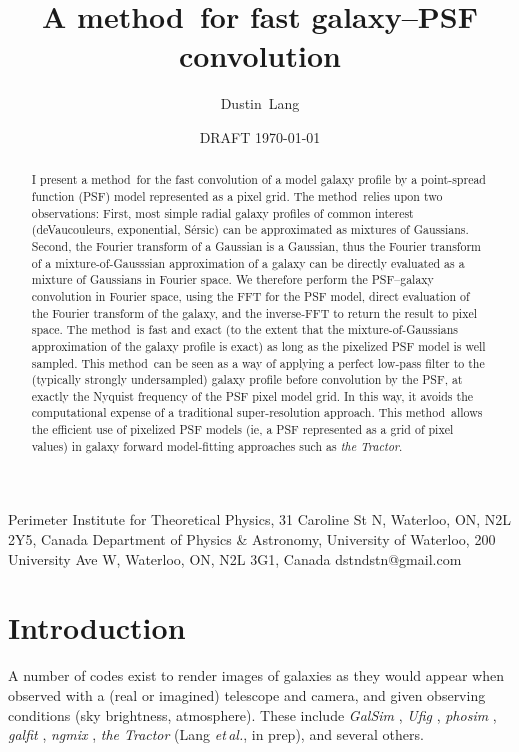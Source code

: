 \documentclass[11pt,preprint]{aastex}
\newcommand{\foreign}[1]{\emph{#1}}
\newcommand{\etal}{\foreign{et\,al.}}
\newcommand{\project}[1]{\textsl{#1}}
\newcommand{\trick}{method}
\newcommand{\sersic}{S\'ersic}
\begin{document}
\title{A \trick\ for fast galaxy--PSF convolution}
\author{Dustin~Lang}
%
{Perimeter Institute for Theoretical Physics,
  31 Caroline St N, Waterloo, ON, N2L 2Y5, Canada}
%
{Department of Physics \& Astronomy,
 University of Waterloo,
 200 University Ave W, Waterloo, ON, N2L 3G1, Canada}
%
{dstndstn@gmail.com}
\date{DRAFT \today}

\begin{abstract}
  I present a \trick\ for the fast convolution of a model galaxy
  profile by a point-spread function (PSF) model represented as a pixel grid.
  The \trick\ relies upon two
  observations: First, most simple radial galaxy profiles of common interest
  (deVaucouleurs, exponential, \sersic) can be approximated as
  mixtures of Gaussians.  Second, the Fourier transform of a Gaussian
  is a Gaussian, thus the Fourier transform of a mixture-of-Gausssian
  approximation of a galaxy can be directly evaluated as a mixture of Gaussians
  in Fourier space.
  We therefore perform the PSF--galaxy convolution in Fourier space,
  using the FFT for the PSF model, direct evaluation of the Fourier
  transform of the galaxy, and the inverse-FFT to return the result to
  pixel space.
  The \trick\ is fast and exact (to the extent that the mixture-of-Gaussians
  approximation of the galaxy profile is exact) as long as the pixelized PSF
  model is well sampled.
  This \trick\ can be seen as a way of applying a perfect low-pass filter to
  the (typically strongly undersampled) galaxy profile before convolution by
  the PSF, at exactly the Nyquist frequency of the PSF pixel model grid.  In
  this way, it avoids the computational expense of a traditional super-resolution
  approach.
  This \trick\ allows
  the efficient use of pixelized PSF models (ie, a PSF represented as
  a grid of pixel values) in galaxy forward model-fitting approaches such as
  \project{the Tractor}.
\end{abstract}

\section{Introduction}

A number of codes exist to render images of galaxies as they would
appear when observed with a (real or imagined) telescope and camera,
and given observing conditions (sky brightness, atmosphere).  These
include \project{GalSim} \citep{galsim}, \project{Ufig} \citep{ufig},
\project{phosim} \citep{phosim}, \project{galfit} \citep{galfit}, 
\project{ngmix} \citep{ngmix},
\project{the Tractor} (Lang \etal, in prep), and several others.
\end{document}
